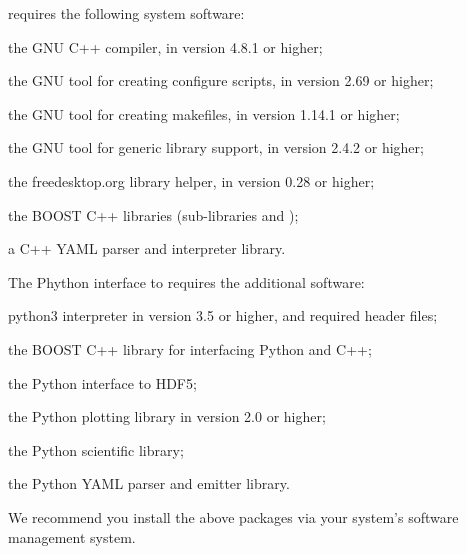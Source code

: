 \ctg requires the following system software:
\begin{description}[labelwidth=.15\textwidth]
    \item[\package{g++}] the GNU C++ compiler, in version 4.8.1 or higher;
    \item[\package{autoconf}] the GNU tool for creating configure scripts, in version 2.69 or higher;
    \item[\package{automake}] the GNU tool for creating makefiles, in version 1.14.1 or higher;
    \item[\package{libtool}] the GNU tool for generic library support, in version 2.4.2 or higher;
    \item[\package{pkg-config}] the freedesktop.org library helper, in version 0.28 or higher;
    \item[\package{BOOST}] the BOOST C++ libraries (sub-libraries  and
            );
    \item[\package{yaml-cpp}] a C++ YAML parser and interpreter library.
\end{description}
The Phython \cite{Python} interface to \ctg requires the additional software:
\begin{description}[labelwidth=.15\textwidth]
    \item[\package{python3}] python3 interpreter in version 3.5 or higher, and required header files;
    \item[\package{BOOST}] the BOOST C++ library  for interfacing Python and C++;
    \item[\package{h5py}] the Python interface to HDF5;
    \item[\package{matplotlib}] the Python plotting library in version 2.0 or higher;
    \item[\package{scipy}] the Python scientific library;
    \item[\package{PyYAML}] the Python YAML parser and emitter library.
\end{description}
We recommend you install the above packages via your system's software management system.\\


